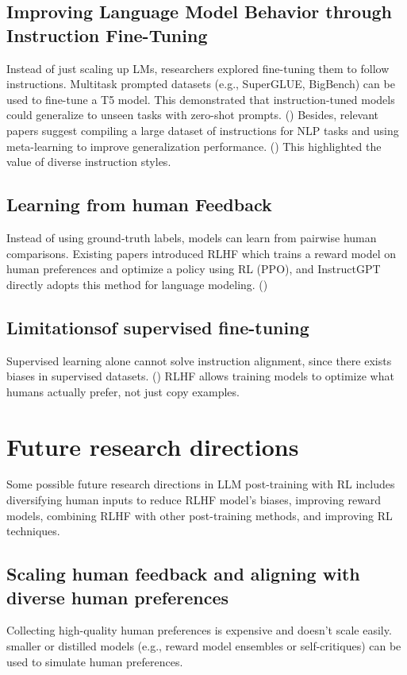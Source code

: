 \documentclass{article} %
\begin{document}
\subsection{Improving Language Model Behavior through Instruction Fine-Tuning}
Instead of just scaling up LMs, researchers explored fine-tuning them to follow instructions. Multitask prompted datasets (e.g., SuperGLUE, BigBench) can be used to fine-tune a T5 model. This demonstrated that instruction-tuned models could generalize to unseen tasks with zero-shot prompts. (\cite{wei2021flan}) Besides, relevant papers suggest compiling a large dataset of instructions for NLP tasks and using meta-learning to improve generalization performance. (\cite{sanh2021t0}) This highlighted the value of diverse instruction styles.

\subsection{Learning from human Feedback}
Instead of using ground-truth labels, models can learn from pairwise human comparisons. Existing papers introduced RLHF which trains a reward model on human preferences and optimize a policy using RL (PPO), and InstructGPT directly adopts this method for language modeling. (\cite{christiano2017preferences})

\subsection{Limitationsof supervised fine-tuning}
Supervised learning alone cannot solve instruction alignment, since there exists biases in supervised datasets. (\cite{stiennon2020learning}) RLHF allows training models to optimize what humans actually prefer, not just copy examples. 


\section{Future research directions}
Some possible future research directions in LLM post-training with RL includes diversifying human inputs to reduce RLHF model's biases, improving reward models, combining RLHF with other post-training methods, and improving RL techniques. 

\subsection{Scaling human feedback and aligning with diverse human preferences}
Collecting high-quality human preferences is expensive and doesn’t scale easily. smaller or distilled models (e.g., reward model ensembles or self-critiques) can be used to simulate human preferences. 
\end{document}
